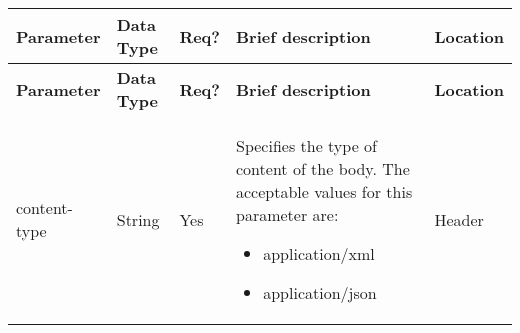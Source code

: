 {\footnotesize{}}%
\begin{longtable}{|>{\raggedright}p{}|>{\raggedright}p{}|>{\raggedright}p{}|>{\raggedright}p{}|>{\raggedright}p{}|}
\hline
\hline 
\textbf{\footnotesize{Parameter }} & \textbf{\footnotesize{Data Type}} & \textbf{\footnotesize{Req?}} & \textbf{\footnotesize{Brief description}} & \textbf{\footnotesize{Location}}\tabularnewline
\hline 
\hline
\endfirsthead
\hline
\hline 
\textbf{\footnotesize{Parameter }} & \textbf{\footnotesize{Data Type}} & \textbf{\footnotesize{Req?}} & \textbf{\footnotesize{Brief description}} & \textbf{\footnotesize{Location}}\tabularnewline
\hline 
\hline
\endhead
\hline 
{\footnotesize{content-type}} & {\footnotesize{String}} & {\footnotesize{Yes}} & {\footnotesize{Specifies the type of content of the body. The acceptable
values for this parameter are:}}{\footnotesize \par}
\begin{itemize}
\item {\footnotesize{application/xml}}{\footnotesize \par}
\item {\footnotesize{application/json}}\end{itemize}
 & {\footnotesize{Header}}\tabularnewline
\hline 
\end{longtable}{\footnotesize \par}

{\footnotesize{}}
